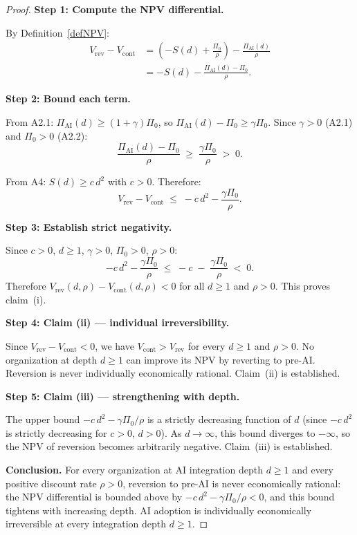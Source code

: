\begin{proof}

\noindent\textbf{Step 1: Compute the NPV differential.}

By Definition~\ref{defNPV}:
\begin{align*}
  V_{\mathrm{rev}} - V_{\mathrm{cont}}
  &= \left(-S(d) + \frac{\Pi_0}{\rho}\right)
     - \frac{\Pi_{\mathrm{AI}}(d)}{\rho} \\
  &= -S(d) - \frac{\Pi_{\mathrm{AI}}(d) - \Pi_0}{\rho}.
\end{align*}

\noindent\textbf{Step 2: Bound each term.}

From A2.1: $\Pi_{\mathrm{AI}}(d) \geq (1+\gamma)\Pi_0$, so
$\Pi_{\mathrm{AI}}(d) - \Pi_0 \geq \gamma\Pi_0$.
Since $\gamma > 0$ (A2.1) and $\Pi_0 > 0$ (A2.2):
\[
  \frac{\Pi_{\mathrm{AI}}(d) - \Pi_0}{\rho} \;\geq\; \frac{\gamma\Pi_0}{\rho} \;>\; 0.
\]

From A4: $S(d) \geq c\,d^2$ with $c > 0$.  Therefore:
\[
  V_{\mathrm{rev}} - V_{\mathrm{cont}}
  \;\leq\; -c\,d^2 - \frac{\gamma\Pi_0}{\rho}.
\]

\noindent\textbf{Step 3: Establish strict negativity.}

Since $c > 0$, $d \geq 1$, $\gamma > 0$, $\Pi_0 > 0$, $\rho > 0$:
\[
  -c\,d^2 - \frac{\gamma\Pi_0}{\rho}
  \;\leq\; -c \;-\; \frac{\gamma\Pi_0}{\rho}
  \;<\; 0.
\]
Therefore $V_{\mathrm{rev}}(d,\rho) - V_{\mathrm{cont}}(d,\rho) < 0$
for all $d \geq 1$ and $\rho > 0$.  This proves claim~(i).

\medskip
\noindent\textbf{Step 4: Claim (ii) — individual irreversibility.}

Since $V_{\mathrm{rev}} - V_{\mathrm{cont}} < 0$, we have
$V_{\mathrm{cont}} > V_{\mathrm{rev}}$ for every $d \geq 1$ and
$\rho > 0$.  No organization at depth $d \geq 1$ can improve its NPV
by reverting to pre-AI.  Reversion is never individually economically
rational.  Claim~(ii) is established.

\medskip
\noindent\textbf{Step 5: Claim (iii) — strengthening with depth.}

The upper bound $-c\,d^2 - \gamma\Pi_0/\rho$ is a strictly decreasing
function of $d$ (since $-c\,d^2$ is strictly decreasing for $c > 0$,
$d > 0$).  As $d \to \infty$, this bound diverges to $-\infty$,
so the NPV of reversion becomes arbitrarily negative.  Claim~(iii) is
established.

\medskip
\noindent\textbf{Conclusion.}
For every organization at AI integration depth $d \geq 1$ and every
positive discount rate $\rho > 0$, reversion to pre-AI is never
economically rational: the NPV differential is bounded above by
$-c\,d^2 - \gamma\Pi_0/\rho < 0$, and this bound tightens with
increasing depth.  AI adoption is individually economically irreversible
at every integration depth $d \geq 1$.
\end{proof}

